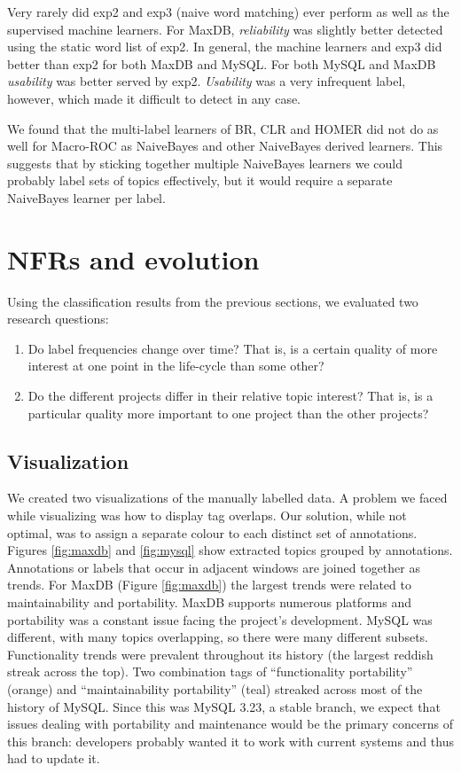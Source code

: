 \documentclass[]{sig-alternate}
\begin{document}
Very rarely did \textsf{exp2} and \textsf{exp3} (naive word matching) ever perform as well as the supervised machine learners. For MaxDB, \textit{reliability} was slightly better detected using the static word list of \textsf{exp2}. In general, the machine learners and \textsf{exp3} did better than \textsf{exp2} for both MaxDB and MySQL. For both MySQL and MaxDB \textit{usability} was better served by \textsf{exp2}. \textit{Usability} was a very infrequent label, however, which made it difficult to detect in any case.

We found that the multi-label learners of BR, CLR and HOMER did not do as well for Macro-ROC as NaiveBayes and other NaiveBayes derived learners. This suggests that by sticking together multiple NaiveBayes learners we could probably label sets of topics effectively, but it would require a separate NaiveBayes learner per label.

\section{NFRs and evolution} 
Using the classification results from the previous sections, we evaluated two research questions:
\begin{enumerate}
\item Do label frequencies change over time? That is, is a certain quality of more interest at one point in the life-cycle than some other? 
\item  Do the different projects differ in their relative topic interest? That is, is a particular quality more important to one project than the other projects?  
\end{enumerate}


\subsection{Visualization}
We created two visualizations of the manually labelled data. A problem we faced while visualizing was how to display tag overlaps. Our solution, while not optimal, was to assign a separate colour to each distinct set of annotations. Figures \ref{fig:maxdb} and \ref{fig:mysql} show extracted topics grouped by annotations. Annotations or labels that occur in adjacent windows are joined together as trends. For MaxDB (Figure \ref{fig:maxdb}) the largest trends were related to maintainability and portability. MaxDB supports numerous platforms and portability was a constant issue facing the project's development. MySQL was different, with many topics overlapping, so there were many different subsets. Functionality trends were prevalent throughout its history (the largest reddish streak across the top). Two combination  tags of ``functionality portability'' (orange) and ``maintainability portability'' (teal) streaked across most of the history of MySQL. Since this was MySQL 3.23, a stable branch, we expect that issues dealing with portability and maintenance would be the primary concerns of this branch: developers probably wanted it to work with current systems and thus had to update it.
\end{document}

